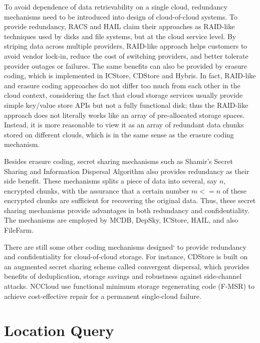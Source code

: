To avoid dependence of data retrievability on a single cloud, redundancy mechanisms need to be introduced into design of cloud-of-cloud systems. To provide redundancy, RACS\cite{abu2010racs} and HAIL\cite{bowers2009hail} claim their approaches as RAID-like techniques used by disks and file systems, but at the cloud service level. By striping data across multiple providers, RAID-like approach helps customers to avoid vendor lock-in, reduce the cost of switching providers, and better tolerate provider outages or failures. The same benefits can also be provided by erasure coding, which is implemented in ICStore\cite{cachin2010dependable}, CDStore\cite{li2015cdstore} and Hybris\cite{dobre2014hybris}. In fact, RAID-like and erasure coding approaches do not differ too much from each other in the cloud context, considering the fact that cloud storage services usually provide simple key/value store APIs but not a fully functional disk; thus the RAID-like approach does not literally works like an array of pre-allocated storage spaces. Instead, it is more reasonable to view it as an array of redundant data chunks stored on different clouds, which is in the same sense as the erasure coding mechanism.

Besides erasure coding, secret sharing mechanisms such as Shamir's Secret Sharing\cite{shamir1979share} and Information Dispersal Algorithm\cite{rabin1989efficient} also provides redundancy as their side benefit. These mechanisms splits a piece of data into several, say $n$, encrypted chunks, with the assurance that a certain number $m <= n$ of these encrypted chunks are sufficient for recovering the original data. Thus, these secret sharing mechanisms provide advantages in both redundancy and confidentiality. The mechanisms are employed by MCDB\cite{alzain2011mcdb}, DepSky\cite{bessani2013depsky}, ICStore\cite{cachin2010dependable}, HAIL\cite{bowers2009hail}, and also FileFarm.

There are still some other coding mechanisms designed` to provide redundancy and confidentiality for cloud-of-cloud storage. For instance, CDStore\cite{li2015cdstore} is built on an augmented secret sharing scheme called convergent dispersal, which provides benefits of deduplication, storage savings and robustness against side-channel attacks. NCCloud\cite{hu2012nccloud} use functional minimum storage regenerating code (F-MSR) to achieve cost-effective repair for a permanent single-cloud failure.

\section{Location Query}
\label{ss:coclocationquery}

